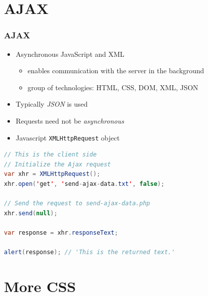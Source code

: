 \documentclass{beamer}
\begin{document}
\section{AJAX} 
\begin{frame}[fragile]\frametitle{AJAX} 

  \begin{itemize}
    \item Asynchronous JavaScript and XML
    \begin{itemize}
      \item enables communication with the server in the background
      \item group of technologies: HTML, CSS, DOM, XML, JSON
    \end{itemize}
    \item Typically \textit{JSON} is used
    \item Requests need not be \textit{asynchronous}
    \item Javascript \texttt{XMLHttpRequest} object
  \end{itemize}
  
  \begin{lstlisting}[language=java, escapechar={^}]
// This is the client side
// Initialize the Ajax request
var xhr = XMLHttpRequest();
xhr.open('get', 'send-ajax-data.txt', false);
 
// Send the request to send-ajax-data.php
xhr.send(null);
 
var response = xhr.responseText;
 
alert(response); // 'This is the returned text.'
  \end{lstlisting}
\end{frame}





\section{More CSS} 
\end{document}
